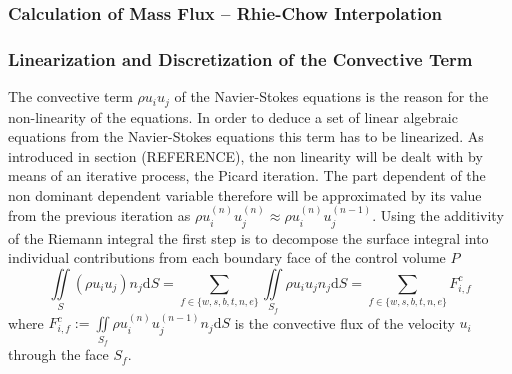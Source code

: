       \subsubsection{Calculation of Mass Flux -- Rhie-Chow Interpolation}

      \subsubsection{Linearization and Discretization of the Convective Term}

      The convective term \(\rho u_i u_j\) of the Navier-Stokes equations is the reason for the non-linearity of the equations. In order to deduce a set of linear algebraic equations from the Navier-Stokes equations this term has to be linearized. As introduced in section (REFERENCE), the non linearity will be dealt with by means of an iterative process, the Picard iteration. The part dependent of the non dominant dependent variable therefore will be approximated by its value from the previous iteration as \( \rho u_i^{(n)} u_j^{(n)} \approx \rho u_i^{(n)} u_j^{(n-1)} \). Using the additivity of the Riemann integral the first step is to decompose the surface integral into individual contributions from each boundary face of the control volume \(P\)
      \begin{displaymath}
      \iint\limits_S (\rho u_i u_j)n_j \mathrm{d}S
      = \sum_{f \in \{w,s,b,t,n,e\}} \iint\limits_{S_f}\rho u_{i} u_{j} n_{j} \mathrm{d}S
      = \sum_{f \in \{w,s,b,t,n,e\}} F_{i,f}^{c}
      \end{displaymath}
      where \(F_{i,f}^c := \iint\limits_{S_f} \rho u_{i}^{(n)} u_{j}^{(n-1)} n_{j} \mathrm{d}S \) is the convective flux of the velocity \(u_i\) through the face \(S_f\). 
      
